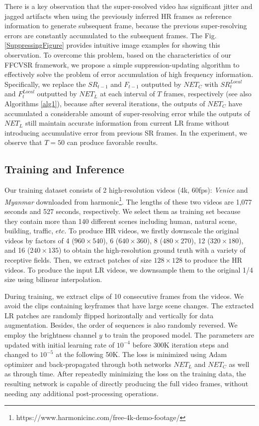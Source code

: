 \documentclass[letterpaper]{article} %
\begin{document}
There is a key observation that the super-resolved video has significant jitter and jagged artifacts when using the previously inferred HR frames as reference information to generate subsequent frame, because the previous super-resolving errors are constantly accumulated to the subsequent frames. The Fig. \ref{SuppressingFigure} provides intuitive image examples for showing this observation. To overcome this problem, based on the characteristics of our FFCVSR framework, we propose a simple suppression-updating algorithm to effectively solve the problem of error accumulation of high frequency information. Specifically, we replace the $SR_{t-1}$ and $F_{t-1}$ outputted by $NET_C$ with $SR^{Local}_t$ and $F^{Local}_t$ outputted by $NET_L$ at each interval of $T$ frames, respectively (see also Algorithms \ref{alg1}), because after several iterations, the outputs of $NET_C$ have accumulated a considerable amount of super-resolving error while the outputs of $NET_L$ still maintain accurate information from current LR frame without introducing accumulative error from previous SR frames. In the experiment, we observe that $T = 50$ can produce favorable results.


\subsection{Training and Inference}


Our training dataset consists of 2 high-resolution videos (4k, 60fps): \textit{Venice} and \textit{Myanmar} downloaded from harmonic\footnote{https://www.harmonicinc.com/free-4k-demo-footage/}. The lengths of these two videos are 1,077 seconds and 527 seconds, respectively. We select them as training set because they contain more than 140 different scenes including human, natural scene, building, traffic, $etc$. To produce HR videos, we firstly downscale the original videos by factors of 4 ($960 \times 540$), 6 ($640 \times 360$), 8 ($480 \times 270$), 12 ($320 \times 180$), and 16 ($240 \times 135$) to obtain the high-resolution ground truth with a variety of receptive fields. Then, we extract patches of size $128 \times 128$ to produce the HR videos. To produce the input LR videos, we downsample them to the original 1/4 size using bilinear interpolation.


During training, we extract clips of 10 consecutive frames from the videos. We avoid the clips containing keyframes that have large scene changes. The extracted LR patches are randomly flipped horizontally and vertically for data augmentation. Besides, the order of sequences is also randomly reversed. We employ the brightness channel $y$ to train the proposed model. The parameters are updated with initial learning rate of $10^{-4}$ before 300K iteration steps and changed to $10^{-5}$ at the following 50K. The loss is minimized using Adam optimizer \cite{Kingma2014Adam} and back-propagated through both networks $NET_L$ and $NET_C$ as well as through time. After repeatedly minimizing the loss on the training data, the resulting network is capable of directly producing the full video frames, without needing any additional post-processing operations.
\end{document}
